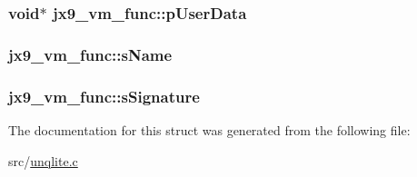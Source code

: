 \hypertarget{structjx9__vm__func_aa992349aa68b1dfb499fb89a3f57b290}{
\subsubsection[{p\-User\-Data}]{\setlength{\rightskip}{0pt plus 5cm}void$\ast$ jx9\-\_\-vm\-\_\-func\-::p\-User\-Data}}\label{d6/d2b/structjx9__vm__func_aa992349aa68b1dfb499fb89a3f57b290}
\hypertarget{structjx9__vm__func_a5ecdbf6df9611fdfa188c3e98e9da4a0}{
\subsubsection[{s\-Name}]{ jx9\-\_\-vm\-\_\-func\-::s\-Name}}\label{d6/d2b/structjx9__vm__func_a5ecdbf6df9611fdfa188c3e98e9da4a0}
\hypertarget{structjx9__vm__func_a04014223ad6a7843a47e26eca1fd04fb}{
\subsubsection[{s\-Signature}]{ jx9\-\_\-vm\-\_\-func\-::s\-Signature}}\label{d6/d2b/structjx9__vm__func_a04014223ad6a7843a47e26eca1fd04fb}


The documentation for this struct was generated from the following file\-:\begin{DoxyCompactItemize}
\item 
src/\hyperlink{unqlite_8c}{unqlite.\-c}\end{DoxyCompactItemize}
